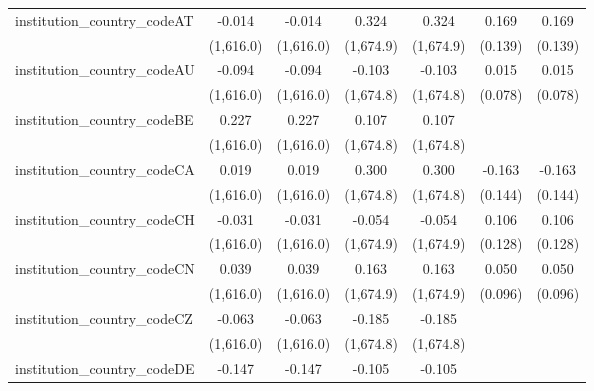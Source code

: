 \begin{tabular}{lcccccc}
   institution\_country\_codeAT          & -0.014         & -0.014         & 0.324         & 0.324         & 0.169        & 0.169\\   
                                         & (1,616.0)      & (1,616.0)      & (1,674.9)     & (1,674.9)     & (0.139)      & (0.139)\\   
   institution\_country\_codeAU          & -0.094         & -0.094         & -0.103        & -0.103        & 0.015        & 0.015\\   
                                         & (1,616.0)      & (1,616.0)      & (1,674.8)     & (1,674.8)     & (0.078)      & (0.078)\\   
   institution\_country\_codeBE          & 0.227          & 0.227          & 0.107         & 0.107         &              &   \\   
                                         & (1,616.0)      & (1,616.0)      & (1,674.8)     & (1,674.8)     &              &   \\   
   institution\_country\_codeCA          & 0.019          & 0.019          & 0.300         & 0.300         & -0.163       & -0.163\\   
                                         & (1,616.0)      & (1,616.0)      & (1,674.8)     & (1,674.8)     & (0.144)      & (0.144)\\   
   institution\_country\_codeCH          & -0.031         & -0.031         & -0.054        & -0.054        & 0.106        & 0.106\\   
                                         & (1,616.0)      & (1,616.0)      & (1,674.9)     & (1,674.9)     & (0.128)      & (0.128)\\   
   institution\_country\_codeCN          & 0.039          & 0.039          & 0.163         & 0.163         & 0.050        & 0.050\\   
                                         & (1,616.0)      & (1,616.0)      & (1,674.9)     & (1,674.9)     & (0.096)      & (0.096)\\   
   institution\_country\_codeCZ          & -0.063         & -0.063         & -0.185        & -0.185        &              &   \\   
                                         & (1,616.0)      & (1,616.0)      & (1,674.8)     & (1,674.8)     &              &   \\   
   institution\_country\_codeDE          & -0.147         & -0.147         & -0.105        & -0.105        &              &   \\   

\end{tabular}
